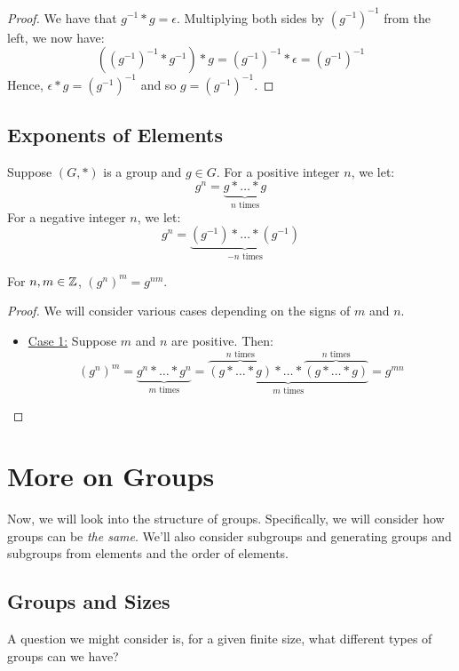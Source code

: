 \documentclass[letterpaper]{article}
\begin{document}
\begin{framed}
    \begin{proof}
        We have that $g^{-1} * g = \epsilon$. Multiplying both sides by $(g^{-1})^{-1}$ from the left, we now have: 
        \[((g^{-1})^{-1} * g^{-1}) * g = (g^{-1})^{-1} * \epsilon = (g^{-1})^{-1}\]
        Hence, $\epsilon * g = (g^{-1})^{-1}$ and so $g = (g^{-1})^{-1}$.     
    \end{proof}
\end{framed}

\subsection{Exponents of Elements}
Suppose $(G, *)$ is a group and $g \in G$. For a positive integer $n$, we let: 
\[g^n = \underbrace{g * \dots * g}_{n \text{ times}}\]
For a negative integer $n$, we let: 
\[g^n = \underbrace{(g^{-1}) * \dots * (g^{-1})}_{-n \text{ times}}\]

\begin{lemma}{}{}
    For $n, m \in \mathbb{Z}$, $(g^n)^m = g^{nm}$. 
\end{lemma}

\begin{framed}
    \begin{proof}
        We will consider various cases depending on the signs of $m$ and $n$. 
        \begin{itemize}
            \item \underline{Case 1:} Suppose $m$ and $n$ are positive. Then: 
            \[(g^n)^m = \underbrace{g^n * \dots * g^n}_{m \text{ times}} = \underbrace{\overbrace{(g * \dots * g)}^{n \text{ times}} * \dots * \overbrace{(g * \dots * g)}^{n \text{ times}}}_{m \text{ times}} = g^{mn}\]
        \end{itemize}
    \end{proof}
\end{framed}

\newpage 
\section{More on Groups}
Now, we will look into the structure of groups. Specifically, we will consider how groups can be \emph{the same}. We'll also consider subgroups and generating groups and subgroups from elements and the order of elements. 

\subsection{Groups and Sizes}
A question we might consider is, for a given finite size, what different types of groups can we have?
\end{document}
